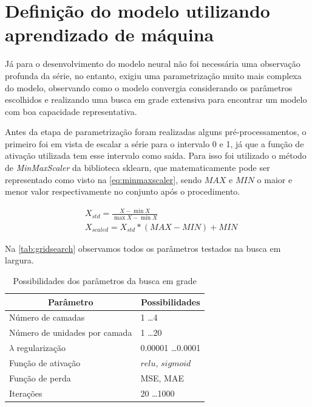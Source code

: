 \documentclass[
    12pt,
    oneside,
    a4paper,
    english,
    brazil
]{abntex2}
\begin{document}
\section{Definição do modelo utilizando aprendizado de máquina}

Já para  o desenvolvimento do modelo  neural não foi necessária  uma observação
profunda da  série, no entanto,  exigiu uma parametrização muito  mais complexa
do  modelo,  observando como  o  modelo  convergia considerando  os  parâmetros
escolhidos e realizando  uma busca em grade extensiva para  encontrar um modelo
com boa capacidade representativa.

Antes da etapa de parametrização  foram realizadas alguns pré-processamentos, o
primeiro foi  em vista  de escalar a  série para o  intervalo 0  e 1, já  que a
função  de  ativação  utilizada  tem  esse  intervalo  como  saída.  Para  isso
foi  utilizado o  método de  \textit{MinMaxScaler} da  biblioteca sklearn,  que
matematicamente pode ser representado  como visto na \autoref{eq:minmaxscaler},
sendo $MAX$ e  $MIN$ o maior e  menor valor respectivamente no  conjunto após o
procedimento.

\begin{align}\label{eq:minmaxscaler}
    &X_{std} = \frac{X - \min X}{\max X-\min X}\\
    &X_{scaled} = X_{std} * (MAX-MIN)+MIN
\end{align}

Na \autoref{tab:gridsearch} observamos todos os parâmetros testados na busca em
largura.

\begin{table}[ht]
\centering
\caption{Possibilidades dos parâmetros da busca em grade}\label{tab:gridsearch}
\begin{tabular}{l l}
\multicolumn{1}{c}{Parâmetro}        & \multicolumn{1}{c}{Possibilidades}  \\
    \toprule
    Número de camadas                & 1 \ldots 4                          \\
    Número de unidades por camada    & 1 \ldots 20                         \\
    $\lambda$ regularização          & 0.00001 \ldots 0.0001               \\
    Função de ativação               & $relu$, $sigmoid$                   \\
    Função de perda                  & MSE, MAE                            \\
    Iterações                        & 20 \ldots 1000
\end{tabular}
\end{table}
\end{document}
